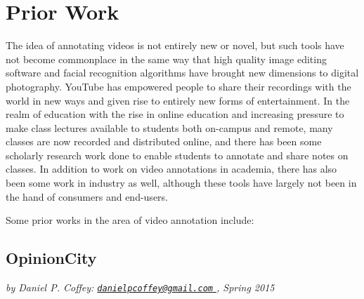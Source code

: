 %
\chapter{Prior Work}
\label{sec:priorwork}



The idea of annotating videos is not entirely new or novel, but such tools have not become commonplace in the same way that high quality image editing software and facial recognition algorithms have brought new dimensions to digital photography.  YouTube has empowered people to share their recordings with the world in new ways and given rise to entirely new forms of entertainment.  In the realm of education with the rise in online education and increasing pressure to make class lectures available to students both on-campus and remote, many classes are now recorded and distributed online, and there has been some scholarly research work done to enable students to annotate and share notes on classes.  In addition to work on video annotations in academia, there has also been some work in industry as well, although these tools have largely not been in the hand of consumers and end-users.

Some prior works in the area of video annotation include:



\section{OpinionCity}
\label{sec:priorwork:opinioncity}

\textit{by Daniel P. Coffey: \href{mailto:danielpcoffey@gmail.com}{\nolinkurl{danielpcoffey@gmail.com} }, Spring 2015}


